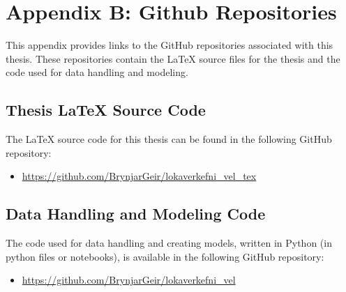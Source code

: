 \chapter*{Appendix B: Github Repositories}
\label{appendix:B}

This appendix provides links to the GitHub repositories associated with this thesis. These repositories contain the \LaTeX{} source files for the thesis and the code used for data handling and modeling.

\section*{Thesis \LaTeX{} Source Code}
The \LaTeX{} source code for this thesis can be found in the following GitHub repository:
\begin{itemize}
    \item \url{https://github.com/BrynjarGeir/lokaverkefni_vel_tex}
\end{itemize}

\section*{Data Handling and Modeling Code}
The code used for data handling and creating models, written in Python (in python files or notebooks), is available in the following GitHub repository:
\begin{itemize}
    \item \url{https://github.com/BrynjarGeir/lokaverkefni_vel}
\end{itemize}